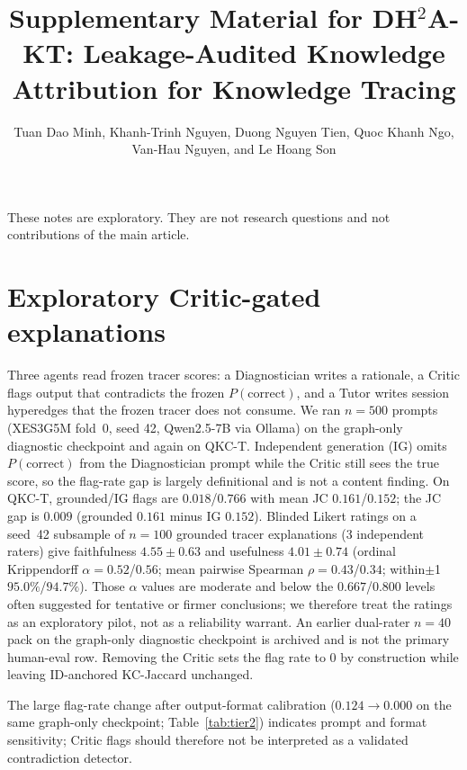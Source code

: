 \documentclass[review,12pt]{elsarticle}
\begin{document}
\begin{frontmatter}
\title{Supplementary Material for DH$^2$A-KT: Leakage-Audited
Knowledge Attribution for Knowledge Tracing}
\author{Tuan Dao Minh, Khanh-Trinh Nguyen, Duong Nguyen Tien,
Quoc Khanh Ngo, Van-Hau Nguyen, and Le Hoang Son}
\end{frontmatter}

These notes are exploratory. They are not research questions and not
contributions of the main article.

\section{Exploratory Critic-gated explanations}
\label{sec:tier2-supp}
Three agents read frozen tracer scores: a Diagnostician writes a
rationale, a Critic flags output that contradicts the frozen
$P(\mathrm{correct})$, and a Tutor writes session hyperedges that the
frozen tracer does not consume. We ran $n{=}500$ prompts (XES3G5M
fold~0, seed 42, Qwen2.5-7B via Ollama) on the graph-only diagnostic
checkpoint and again on QKC-T. Independent generation (IG) omits
$P(\mathrm{correct})$ from the Diagnostician prompt while the Critic
still sees the true score, so the flag-rate gap is largely definitional
and is not a content finding.
On QKC-T, grounded/IG flags are $0.018$/$0.766$ with mean JC
$0.161$/$0.152$; the JC gap is $0.009$ (grounded $0.161$ minus IG
$0.152$).
Blinded Likert ratings on a seed~42 subsample of $n{=}100$ grounded
tracer explanations (3 independent raters) give faithfulness
$4.55{\pm}0.63$ and usefulness $4.01{\pm}0.74$ (ordinal Krippendorff
$\alpha{=}0.52$/$0.56$; mean pairwise Spearman $\rho{=}0.43$/$0.34$;
within$\pm$1 $95.0\%$/$94.7\%$).
Those $\alpha$ values are moderate and below the $0.667$/$0.800$
levels often suggested for tentative or firmer conclusions; we
therefore treat the ratings as an exploratory pilot, not as a
reliability warrant.
An earlier dual-rater $n{=}40$ pack on
the graph-only diagnostic checkpoint is archived and is not the primary
human-eval row.
Removing the Critic sets the flag rate to $0$ by construction while
leaving ID-anchored KC-Jaccard unchanged.

The large flag-rate change after output-format calibration
($0.124\rightarrow 0.000$ on the same graph-only checkpoint;
Table~\ref{tab:tier2}) indicates prompt and format sensitivity; Critic
flags should therefore not be interpreted as a validated contradiction
detector.



\end{document}
